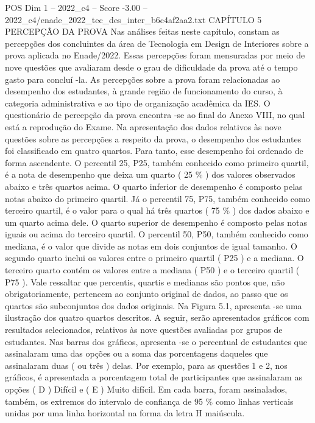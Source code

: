 \begin{textsample}{POS Dim 1 – 2022\_c4 – Score -3.00 – 2022\_c4/enade\_2022\_tec\_des\_inter\_b6c4af2aa2.txt}  \label{ex:f1_pos_256}
CAPÍTULO 5 PERCEPÇÃO DA PROVA Nas análises feitas neste capítulo, constam as percepções dos concluintes da área de Tecnologia em Design de Interiores sobre a prova aplicada no Enade/2022.
Essas percepções foram mensuradas por meio de nove questões que avaliaram desde o grau de dificuldade da prova até o tempo gasto para concluí -la.
As percepções sobre a prova foram relacionadas ao desempenho dos estudantes, à grande região de funcionamento do curso, à categoria administrativa e ao tipo de organização acadêmica da IES.
O questionário de percepção da prova encontra -se ao final do Anexo VIII, no qual está a reprodução do Exame.
Na apresentação dos dados relativos às nove questões sobre as percepções a respeito da prova, o desempenho dos estudantes foi classificado em quatro quartos.
Para tanto, esse desempenho foi ordenado de forma ascendente.
O percentil 25, P25, também conhecido como primeiro quartil, é a nota de desempenho que deixa um quarto ( 25 \% ) dos valores observados abaixo e três quartos acima.
O quarto inferior de desempenho é composto pelas notas abaixo do primeiro quartil.
Já o percentil 75, P75, também conhecido como terceiro quartil, é o valor para o qual há três quartos ( 75 \% ) dos dados abaixo e um quarto acima dele.
O quarto superior de desempenho é composto pelas notas iguais ou acima do terceiro quartil.
O percentil 50, P50, também conhecido como mediana, é o valor que divide as notas em dois conjuntos de igual tamanho.
O segundo quarto inclui os valores entre o primeiro quartil ( P25 ) e a mediana.
O terceiro quarto contém os valores entre a mediana ( P50 ) e o terceiro quartil ( P75 ).
Vale ressaltar que percentis, quartis e medianas são pontos que, não obrigatoriamente, pertencem ao conjunto original de dados, ao passo que os quartos são subconjuntos dos dados originais.
Na Figura 5.1, apresenta -se uma ilustração dos quatro quartos descritos.
A seguir, serão apresentados gráficos com resultados selecionados, relativos às nove questões avaliadas por grupos de estudantes.
Nas barras dos gráficos, apresenta -se o percentual de estudantes que assinalaram uma das opções ou a soma das porcentagens daqueles que assinalaram duas ( ou três ) delas.
Por exemplo, para as questões 1 e 2, nos gráficos, é apresentada a porcentagem total de participantes que assinalaram as opções ( D ) Difícil e ( E ) Muito difícil.
Em cada barra, foram assinalados, também, os extremos do intervalo de confiança de 95 \% como linhas verticais unidas por uma linha horizontal na forma da letra H maiúscula.

\end{textsample}
